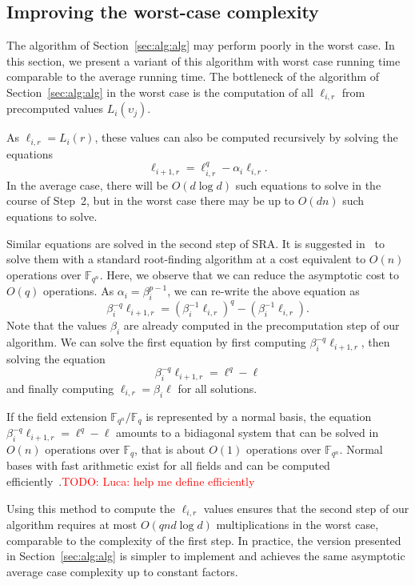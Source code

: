 \documentclass{sig-alternate}
\newcommand{\ff}[1]{\mathbb{F}_{#1}}
\newcommand{\fq}{\ff{q}}
\newcommand{\fqn}{\ff{q^n}}
\newcounter{algo}
\newcommand{\todo}[1]{\textcolor{red}{TODO: #1}}
\begin{document}
\subsection{Improving the worst-case complexity\label{sec:ext:variant}}

The algorithm of Section~\ref{sec:alg:alg} may perform poorly in the worst case. In this section, we present a variant of this algorithm with worst case running time comparable to the average running time.
%
The bottleneck of the algorithm of Section~\ref{sec:alg:alg} in the worst case is the computation of all $\ell_{i,r}$ from precomputed values $L_i(\upsilon_j)$.

As $\ell_{i,r}=L_i(r)$, these values can also be computed recursively by solving the equations
$$\ell_{i+1,r}=\ell_{i,r}^q-\alpha_i\ell_{i,r}.$$
%
In the average case, there will be $O(d\log d)$ such equations to solve in the course of Step~2, but in the worst case there may be up to $O(dn)$ such equations to solve.

Similar equations are solved in the second step of SRA. It is suggested in~\cite{cgUCL-P14} to solve them with a standard root-finding algorithm at a cost equivalent to $O(n)$ operations over $\fqn$.
Here, we observe that we can reduce the asymptotic cost to $O(q)$ operations. As $\alpha_i=\beta_i^{p-1}$, we can re-write the above equation as 
$$\beta_i^{-q}\ell_{i+1,r}=(\beta_i^{-1}\ell_{i,r})^q-(\beta_i^{-1}\ell_{i,r}).$$ 
Note that the values $\beta_i$ are already computed in the precomputation step of our algorithm. We can solve the first equation by first computing $\beta_i^{-q}\ell_{i+1,r}$, then solving the equation 
$$\beta_i^{-q}\ell_{i+1,r}=\ell^q-\ell$$
and finally computing $\ell_{i,r}=\beta_i\ell$ for all solutions.

If the field extension $\fqn/\fq$ is represented by a normal basis, the equation $\beta_i^{-q}\ell_{i+1,r}=\ell^q-\ell$ amounts to a bidiagonal system that can be solved in $O(n)$ operations over $\fq$, that is about $O(1)$ operations over $\fqn$.
%
Normal bases with fast arithmetic exist for all fields and can be computed efficiently~\cite{Couveignes-Lercier}.\todo{Luca: help me define efficiently}

Using this method to compute the $\ell_{i,r}$ values ensures that the second step of our algorithm requires at most $O(qnd\log d)$ multiplications in the worst case, comparable to the complexity of the first step.
%
In practice, the version presented in Section~\ref{sec:alg:alg} is simpler to implement and achieves the same asymptotic average case complexity up to constant factors. 
\end{document}
